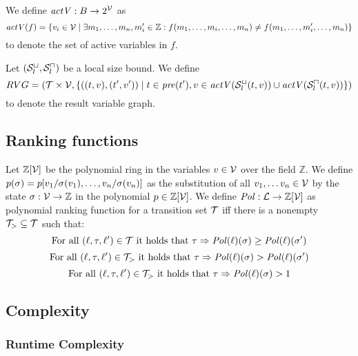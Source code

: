 \begin{definition} 
	We define $\mathit{actV}: B \rightarrow 2^{\mathcal{V}}$ as 
	\[ \mathit{actV}(f) = \lbrace  v_i \in \mathcal{V} \mid \exists m_1, \dots, m_n, m_i' \in \mathbb{Z}: f(m_1, \dots, m_i, \dots, m_n) \neq f(m_1, \dots, m_i', \dots, m_n) \rbrace \]
	to denote the set of active variables in $f$.
\end{definition}

\begin{definition}
	Let ${({\mathcal{S}^\sqcup_l}, {\mathcal{S}^\sqcap_l})}$ be a local size bound.
	We define 
	\[ RVG = (\mathcal{T} \times \mathcal{V}, \lbrace ((t, v), (t', v')) \mid t \in \mathit{pre}(t'), v \in \mathit{actV}({\mathcal{S}^\sqcup_l}(t,v)) \cup \mathit{actV}({\mathcal{S}^\sqcap_l}(t,v)) \rbrace) \]
	to denote the result variable graph.
\end{definition}


\subsection{Ranking functions}

\begin{definition} 
	Let $\mathbb{Z}[\mathcal{V}]$ be the polynomial ring in the variables $v \in \mathcal{V}$ over the field $\mathbb{Z}$.
	We define $p(\sigma) = p[v_1/\sigma(v_1), \dots, v_n/\sigma(v_n)]$ as the substitution of all $v_1, \dots v_n \in \mathcal{V}$ by the state $\sigma: \mathcal{V} \rightarrow \mathbb{Z}$ in the polynomial $p \in \mathbb{Z}[\mathcal{V}]$.
	We define $\mathit{Pol}: \mathcal{L} \rightarrow \mathbb{Z}[\mathcal{V}]$ as polynomial ranking function for a transition set $\mathcal{T}$ iff there is a nonempty $\mathcal{T}_{>} \subseteq \mathcal{T}$ such that:
	\[ \text{For all } (\ell, \tau, \ell') \in \mathcal{T} \text{ it holds that } \tau \Rightarrow \mathit{Pol}(\ell)(\sigma) \geq \mathit{Pol}(\ell)(\sigma') \]
	\[ \text{For all } (\ell, \tau, \ell') \in \mathcal{T}_{>} \text{ it holds that } \tau \Rightarrow \mathit{Pol}(\ell)(\sigma) > \mathit{Pol}(\ell)(\sigma') \]
	\[ \text{For all } (\ell, \tau, \ell') \in \mathcal{T}_{>} \text{ it holds that } \tau \Rightarrow \mathit{Pol}(\ell)(\sigma) > 1 \]
\end{definition}


\subsection{Complexity}

\subsubsection{Runtime Complexity}

